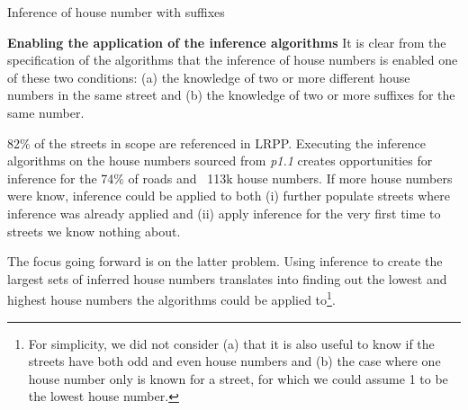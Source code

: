 \vspace{5mm}

\begin{algorithm}[H]
    \caption{Inference of house number with suffixes}
    \label{algo:inference-numbers-suffix}
\end{algorithm}

\vspace{5mm}

\textbf{Enabling the application of the inference algorithms} It is clear from the specification of the algorithms that the inference of house numbers is enabled one of these two conditions: (a) the knowledge of two or more different house numbers in the same street and (b) the knowledge of two or more suffixes for the same number.

82\% of the streets in scope are referenced in LRPP. Executing the inference algorithms on the house numbers sourced from {\it p1.1} creates opportunities for inference for the 74\% of roads and ~113k house numbers. If more house numbers were know, inference could be applied to both (i) further populate streets where inference was already applied and (ii) apply inference for the very first time to streets we know nothing about.

\begin{figure}[!ht]
    \begin{floatrow}
   \end{floatrow}
\end{figure}
        
The focus going forward is on the latter problem. Using inference to create the largest sets of inferred house numbers translates into finding out the lowest and highest house numbers the algorithms could be applied to\footnote{For simplicity, we did not consider (a) that it is also useful to know if the streets have both odd and even house numbers and (b) the case where one house number only is known for a street, for which we could assume 1 to be the lowest house number.}.

